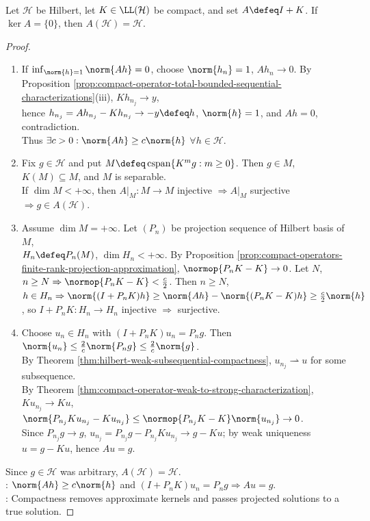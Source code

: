 \begin{proposition} \label{prop:compact-identity-perturbation-injective-surjective} \\
Let $\mathcal{H}$ be Hilbert, let $K\in\LL(\mathcal{H})$ be compact, and set $A\defeq I+K$. If $\ker A=\{0\}$, then $A(\mathcal{H})=\mathcal{H}$.
\begin{proof}
\begin{enumerate}[label=(\roman*)]
\setlength{\itemsep}{0pt}
\item If $\inf_{\norm{h}=1}\norm{Ah}=0$, choose $\norm{h_n}=1$, $Ah_n\to0$. By Proposition \ref{prop:compact-operator-total-bounded-sequential-characterizations}(iii), $Kh_{n_j}\to y$,\\
hence $h_{n_j}=Ah_{n_j}-Kh_{n_j}\to-y\defeq h$, $\norm{h}=1$, and $Ah=0$, contradiction.\\
Thus $\exists c>0:\norm{Ah}\geq c\norm{h}$ $\forall h\in\mathcal{H}$.
\item Fix $g\in\mathcal{H}$ and put $M\defeq\operatorname{cspan}\{K^m g:m\geq0\}$. Then $g\in M$, $K(M)\subseteq M$, and $M$ is separable.\\
If $\dim M<+\infty$, then $A|_M:M\to M$ injective $\Rightarrow A|_M$ surjective $\Rightarrow g\in A(\mathcal{H})$.
\item Assume $\dim M=+\infty$. Let $(P_n)$ be projection sequence of Hilbert basis of $M$,\\
$H_n\defeq P_n(M)$, $\dim H_n<+\infty$. By Proposition \ref{prop:compact-operators-finite-rank-projection-approximation}, $\normop{P_nK-K}\to0$. Let $N$,\\
$n\geq N\Rightarrow\normop{P_nK-K}<\frac{c}{2}$. Then $n\geq N$, $h\in H_n\Rightarrow\norm{(I+P_nK)h}\geq\norm{Ah}-\norm{(P_nK-K)h}\geq\frac{c}{2}\norm{h}$, so $I+P_nK:H_n\to H_n$ injective $\Rightarrow$ surjective.
\item Choose $u_n\in H_n$ with $(I+P_nK)u_n=P_ng$. Then $\norm{u_n}\leq\frac{2}{c}\norm{P_ng}\leq\frac{2}{c}\norm{g}$.\\
By Theorem \ref{thm:hilbert-weak-subsequential-compactness}, $u_{n_j}\rightharpoonup u$ for some subsequence.\\
By Theorem \ref{thm:compact-operator-weak-to-strong-characterization}, $Ku_{n_j}\to Ku$, $\norm{P_{n_j}Ku_{n_j}-Ku_{n_j}}\leq\normop{P_{n_j}K-K}\norm{u_{n_j}}\to0$.\\
Since $P_{n_j}g\to g$, $u_{n_j}=P_{n_j}g-P_{n_j}Ku_{n_j}\to g-Ku$; by weak uniqueness $u=g-Ku$, hence $Au=g$.
\end{enumerate}
Since $g\in\mathcal{H}$ was arbitrary, $A(\mathcal{H})=\mathcal{H}$.\\
: $\norm{Ah}\geq c\norm{h}$ and $(I+P_nK)u_n=P_ng\Rightarrow Au=g$.\\
: Compactness removes approximate kernels and passes projected solutions to a true solution.
\end{proof}
\end{proposition}

